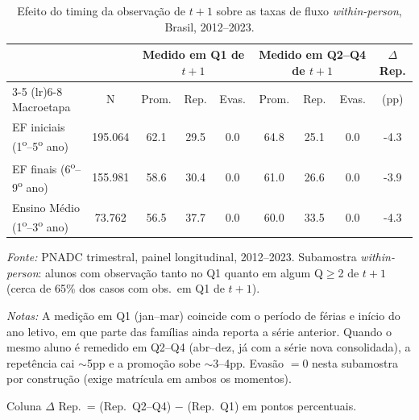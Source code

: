 \begin{table}[htbp]
\centering
\caption{Efeito do timing da observa\c{c}\~ao de $t+1$ sobre as taxas de fluxo \emph{within-person}, Brasil, 2012--2023.}
\label{tab:t5_efeito_ferias}
\begin{threeparttable}
\small
\begin{tabular}{lcccccccc}
\toprule
& & \multicolumn{3}{c}{Medido em Q1 de $t+1$} & \multicolumn{3}{c}{Medido em Q2--Q4 de $t+1$} & $\Delta$ Rep. \\
\cmidrule(lr){3-5} \cmidrule(lr){6-8}
Macroetapa & N & Prom. & Rep. & Evas. & Prom. & Rep. & Evas. & (pp) \\
\midrule
EF iniciais (1\textsuperscript{o}--5\textsuperscript{o} ano) & 195.064 &  62.1 &  29.5 &   0.0 &  64.8 &  25.1 &   0.0 &  -4.3 \\
EF finais (6\textsuperscript{o}--9\textsuperscript{o} ano) & 155.981 &  58.6 &  30.4 &   0.0 &  61.0 &  26.6 &   0.0 &  -3.9 \\
Ensino M\'edio (1\textsuperscript{o}--3\textsuperscript{o} ano) & 73.762 &  56.5 &  37.7 &   0.0 &  60.0 &  33.5 &   0.0 &  -4.3 \\
\bottomrule
\end{tabular}
\begin{tablenotes}\footnotesize
\item \textit{Fonte:} PNADC trimestral, painel longitudinal, 2012--2023. Subamostra \emph{within-person}: alunos com observa\c{c}\~ao tanto no Q1 quanto em algum Q$\geq$2 de $t+1$ (cerca de 65\% dos casos com obs.\ em Q1 de $t+1$).
\item \textit{Notas:} A medi\c{c}\~ao em Q1 (jan--mar) coincide com o per\'iodo de f\'erias e in\'icio do ano letivo, em que parte das fam\'ilias ainda reporta a s\'erie anterior. Quando o mesmo aluno \'e remedido em Q2--Q4 (abr--dez, j\'a com a s\'erie nova consolidada), a repet\^encia cai $\sim$5pp e a promo\c{c}\~ao sobe $\sim$3--4pp. Evas\~ao $= 0$ nesta subamostra por constru\c{c}\~ao (exige matr\'icula em ambos os momentos).
\item Coluna $\Delta$ Rep.\ = (Rep.\ Q2--Q4) $-$ (Rep.\ Q1) em pontos percentuais.
\end{tablenotes}
\end{threeparttable}
\end{table}
